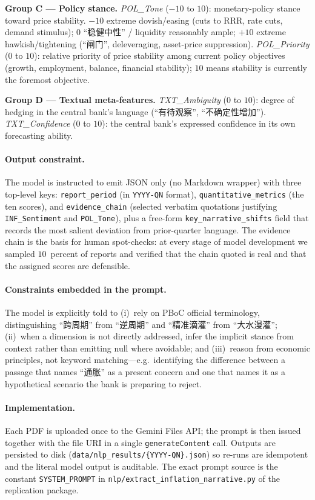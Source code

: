 \documentclass[AER]{AEA}
\begin{document}
\textbf{Group C --- Policy stance.}
\textit{POL\_Tone} ($-10$ to $10$): monetary-policy stance toward price
stability. $-10$ extreme dovish/easing (cuts to RRR, rate cuts, demand
stimulus); $0$ ``稳健中性'' / liquidity reasonably ample; $+10$ extreme
hawkish/tightening (``闸门'', deleveraging, asset-price suppression).
\textit{POL\_Priority} ($0$ to $10$): relative priority of price stability
among current policy objectives (growth, employment, balance, financial
stability); $10$ means stability is currently the foremost objective.

\textbf{Group D --- Textual meta-features.}
\textit{TXT\_Ambiguity} ($0$ to $10$): degree of hedging in the central
bank's language (``有待观察'', ``不确定性增加''). \textit{TXT\_Confidence}
($0$ to $10$): the central bank's expressed confidence in its own
forecasting ability.

\paragraph{Output constraint.} The model is instructed to emit JSON only
(no Markdown wrapper) with three top-level keys: \texttt{report\_period}
(in \texttt{YYYY-QN} format), \texttt{quantitative\_metrics} (the ten
scores), and \texttt{evidence\_chain} (selected verbatim quotations
justifying \texttt{INF\_Sentiment} and \texttt{POL\_Tone}), plus a free-form
\texttt{key\_narrative\_shifts} field that records the most salient
deviation from prior-quarter language. The evidence chain is the basis for
human spot-checks: at every stage of model development we sampled
$10$~percent of reports and verified that the chain quoted is real and
that the assigned scores are defensible.

\paragraph{Constraints embedded in the prompt.} The model is explicitly
told to (i)~rely on PBoC official terminology, distinguishing ``跨周期''
from ``逆周期'' and ``精准滴灌'' from ``大水漫灌''; (ii)~when a dimension
is not directly addressed, infer the implicit stance from context rather
than emitting null where avoidable; and (iii)~reason from economic
principles, not keyword matching---e.g.\ identifying the difference between
a passage that names ``通胀'' as a present concern and one that names it as
a hypothetical scenario the bank is preparing to reject.

\paragraph{Implementation.} Each PDF is uploaded once to the Gemini Files
API; the prompt is then issued together with the file URI in a single
\texttt{generateContent} call. Outputs are persisted to disk
(\texttt{data/nlp\_results/\{YYYY-QN\}.json}) so re-runs are idempotent
and the literal model output is auditable. The exact prompt source is
the constant \texttt{SYSTEM\_PROMPT} in
\texttt{nlp/extract\_inflation\_narrative.py} of the replication package.
\end{document}

